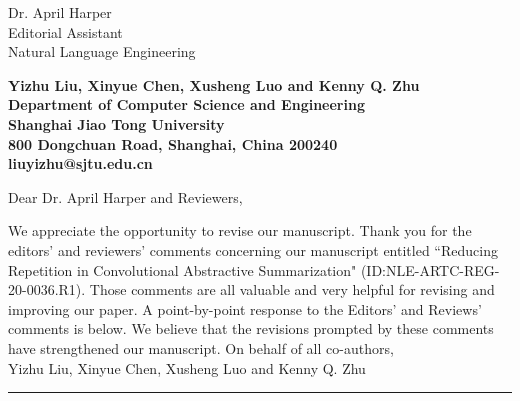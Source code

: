 \documentclass[11pt]{letter} %
\theoremstyle{definition}
\begin{document}
	
	
	\begin{letter}{Dr. April Harper \\
            Editorial Assistant \\
			Natural Language Engineering}
		
        \begin{center}
        \large\bf Yizhu Liu, Xinyue Chen, Xusheng Luo and Kenny Q. Zhu \\ %
        Department of Computer Science and Engineering \\ Shanghai Jiao Tong University \\ 800 Dongchuan Road, Shanghai, China 200240 \\
        liuyizhu@sjtu.edu.cn
        \end{center} 
        \vfill

        \signature{Yizhu Liu, Xinyue Chen, Xusheng Luo and Kenny Q. Zhu} %
		
		
		\opening{Dear Dr. April Harper and Reviewers,} 
		
		We appreciate the opportunity to revise our manuscript. 
		Thank you for the editors' and reviewers' comments concerning our 
		manuscript entitled ``Reducing Repetition in Convolutional Abstractive Summarization" (ID:NLE-ARTC-REG-20-0036.R1). 
		Those comments are all valuable and very helpful
		for revising and improving our paper.
		A point-by-point response to the Editors' and Reviews' comments is below. 
		We believe that the revisions prompted by these comments have strengthened our manuscript.
		\newline\newline
		On behalf of all co-authors,\\
		Yizhu Liu, Xinyue Chen, Xusheng Luo and Kenny Q. Zhu
		\newline\hrule


\end{letter}
\end{document}
